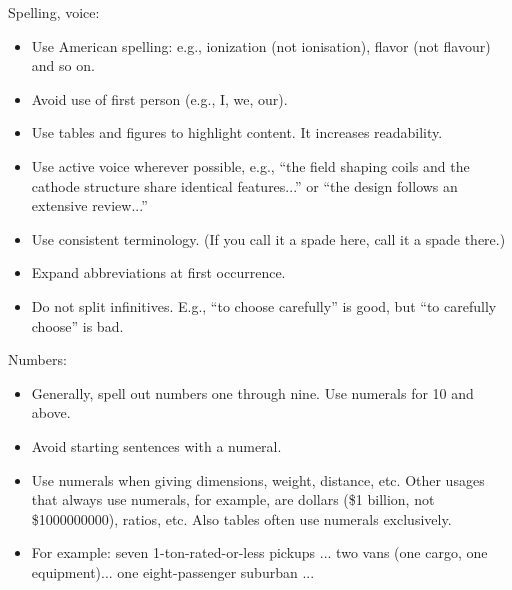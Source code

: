 Spelling, voice:
\begin{itemize}
\item Use American spelling: e.g., ionization (not ionisation), flavor (not flavour) and so on.
\item Avoid use of first person (e.g., I, we, our). 
\item Use tables and figures to highlight content. It increases readability.
\item Use active voice wherever possible, e.g., ``the field shaping coils and the cathode structure share identical features...'' or ``the design follows  an extensive review...''
\item Use consistent terminology. (If you call it a spade here, call it a spade there.)
\item Expand abbreviations at first occurrence.
\item Do not split infinitives. E.g., ``to choose carefully'' is good, but ``to carefully choose'' is bad.
\end{itemize}

Numbers:
\begin{itemize}
\item Generally, spell out numbers one through nine. Use numerals for \num{10} and above.
\item Avoid starting sentences with a numeral.
\item Use numerals when giving dimensions, weight, distance, etc. Other usages that always use numerals, for example, are dollars (\$1 billion, not \$\num{1000000000}), ratios, etc. Also tables often use numerals exclusively.
\item For example: seven 1-ton-rated-or-less pickups ... two vans (one cargo, one equipment)... one eight-passenger suburban ...
\end{itemize}

